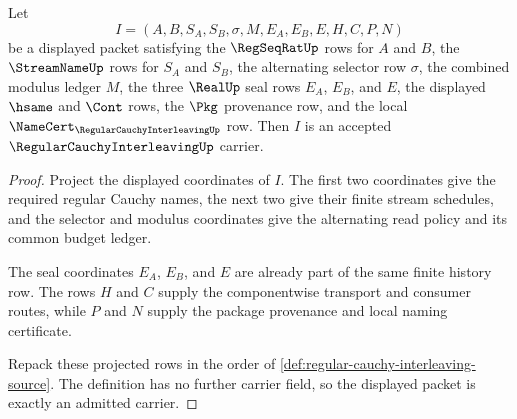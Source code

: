 \begin{theorem}
\label{thm:regular-cauchy-interleaving-carrier-admission}
Let
$$
I=(A,B,S_A,S_B,\sigma,M,E_A,E_B,E,H,C,P,N)
$$
be a displayed packet satisfying the $\RegSeqRatUp$ rows for $A$ and $B$, the $\StreamNameUp$ rows for $S_A$ and $S_B$, the alternating selector row $\sigma$, the combined modulus ledger $M$, the three $\RealUp$ seal rows $E_A$, $E_B$, and $E$, the displayed $\hsame$ and $\Cont$ rows, the $\Pkg$ provenance row, and the local $\NameCert_{\RegularCauchyInterleavingUp}$ row. Then $I$ is an accepted $\RegularCauchyInterleavingUp$ carrier.
\end{theorem}
\begin{proof}
Project the displayed coordinates of $I$. The first two coordinates give the required regular Cauchy names, the next two give their finite stream schedules, and the selector and modulus coordinates give the alternating read policy and its common budget ledger.

The seal coordinates $E_A$, $E_B$, and $E$ are already part of the same finite history row. The rows $H$ and $C$ supply the componentwise transport and consumer routes, while $P$ and $N$ supply the package provenance and local naming certificate.

Repack these projected rows in the order of \autoref{def:regular-cauchy-interleaving-source}. The definition has no further carrier field, so the displayed packet is exactly an admitted carrier.
\end{proof}

